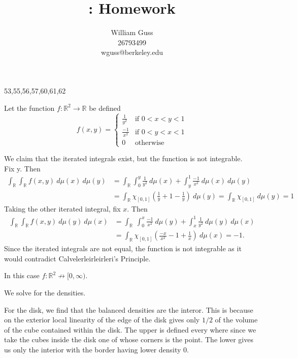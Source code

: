 \documentclass[letter]{article}
\title{\bCLASS: Homework \bHWN}
\author{William Guss\\26793499\\wguss@berkeley.edu}
\newenvironment{menumerate}{%
  \edef\backupindent{\the\parindent}%
  \enumerate%
  \setlength{\parindent}{\backupindent}%
}{\endenumerate}
\begin{document}
\maketitle
\thispagestyle{empty}


53,55,56,57,60,61,62
\begin{menumerate}
	\setcounter{enumi}{52}
	\item Let the function $f: \mathbb{R}^2 \to \mathbb{R}$ be defined
	\begin{equation}
		f(x,y) = \left\{ \begin{array}{ll}
		\frac{1}{y^2} & \text{if } 0 < x < y < 1 \\
		\frac{-1}{x^2} & \text{if } 0 < y < x < 1 \\
		0 & \text{otherwise}
		\end{array} \right.
	\end{equation}
	\begin{menumerate}
		\item We claim that the iterated integrals exist, but the function is not integrable. \\
		Fix y. Then
		\begin{equation*}
			\begin{aligned}
				\int_\mathbb{R} \int_\mathbb{R} f(x,y)\ d\mu(x)\ d\mu(y) &= \int_\mathbb{R} \int_0^y \frac{1}{y^2}\ d\mu(x) + \int_y^1 \frac{-1}{x^2}\ d\mu(x)\ d\mu(y)\\
				& = \int_\mathbb{R} \chi_{[0,1]}\left(\frac{1}{y} + 1 - \frac{1}{y}\right)\ d\mu(y)= \int_\mathbb{R} \chi_{[0,1]}\ d\mu(y) = 1 
			\end{aligned}
		\end{equation*}
		Taking the other iterated integral, fix $x$. Then
		\begin{equation*}
			\begin{aligned}
				\int_\mathbb{R} \int_\mathbb{R} f(x,y)\ d\mu(y)\ d\mu(x) &= \int_\mathbb{R}\ \int_0^x \frac{-1}{x^2}\ d\mu(y) + \int_x^1 \frac{1}{y^2} \ d\mu(y)\  d\mu(x)\\
				&= \int_\mathbb{R} \chi_{[0,1]}\left(\frac{-x}{x^2} -1 + \frac{1}{x} \right)\ d\mu(x) = -1.
			\end{aligned}
		\end{equation*}
		Since the iterated integrals are not equal, the function is not integrable as it would contradict Calvelerleirleirleri's Principle.
		\item In this case $f: \mathbb{R}^2 \not \to [0, \infty)$.
	\end{menumerate}
	\setcounter{enumi}{54}
	\item We solve for the densities.
	\begin{menumerate}
		\item For the disk, we find that the balanced densities are the interor. This is because on the exterior local linearity of the edge of the disk gives only $1/2$ of
		the volume of the cube contained within the disk. The upper is defined every where since we take the cubes inside the disk one of whose corners is the point. The lower gives us only the interior
		with the border having lower density $0.$


\end{menumerate}
\end{menumerate}
\end{document}
